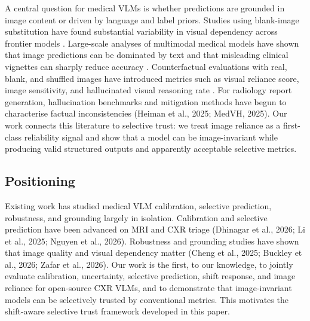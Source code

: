 A central question for medical VLMs is whether predictions are grounded in image content or driven by language and label priors. Studies using blank-image substitution have found substantial variability in visual dependency across frontier models \citep{felizzi2025grounded}. Large-scale analyses of multimodal medical models have shown that image predictions can be dominated by text and that misleading clinical vignettes can sharply reduce accuracy \citep{buckley2026exploit}. Counterfactual evaluations with real, blank, and shuffled images have introduced metrics such as visual reliance score, image sensitivity, and hallucinated visual reasoning rate \citep{zafar2026beyond}. For radiology report generation, hallucination benchmarks and mitigation methods have begun to characterise factual inconsistencies (Heiman et al., 2025; MedVH, 2025). Our work connects this literature to selective trust: we treat image reliance as a first-class reliability signal and show that a model can be image-invariant while producing valid structured outputs and apparently acceptable selective metrics.

\subsection{Positioning}

Existing work has studied medical VLM calibration, selective prediction, robustness, and grounding largely in isolation. Calibration and selective prediction have been advanced on MRI and CXR triage (Dhinagar et al., 2026; Li et al., 2025; Nguyen et al., 2026). Robustness and grounding studies have shown that image quality and visual dependency matter (Cheng et al., 2025; Buckley et al., 2026; Zafar et al., 2026). Our work is the first, to our knowledge, to jointly evaluate calibration, uncertainty, selective prediction, shift response, and image reliance for open-source CXR VLMs, and to demonstrate that image-invariant models can be selectively trusted by conventional metrics. This motivates the shift-aware selective trust framework developed in this paper.
